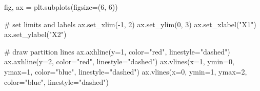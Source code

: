 \documentclass[
  letterpaper,
  DIV=11,
  numbers=noendperiod]{scrartcl}
\newenvironment{Shaded}{\begin{snugshade}}{\end{snugshade}}
\newcommand{\CommentTok}[1]{\textcolor[rgb]{0.37,0.37,0.37}{#1}}
\newcommand{\DecValTok}[1]{\textcolor[rgb]{0.68,0.00,0.00}{#1}}
\newcommand{\NormalTok}[1]{\textcolor[rgb]{0.00,0.23,0.31}{#1}}
\newcommand{\OperatorTok}[1]{\textcolor[rgb]{0.37,0.37,0.37}{#1}}
\newcommand{\StringTok}[1]{\textcolor[rgb]{0.13,0.47,0.30}{#1}}
\begin{document}
\begin{Shaded}
\begin{Highlighting}[]
\NormalTok{fig, ax }\OperatorTok{=}\NormalTok{ plt.subplots(figsize}\OperatorTok{=}\NormalTok{(}\DecValTok{6}\NormalTok{, }\DecValTok{6}\NormalTok{))}

\CommentTok{\# set limits and labels}
\NormalTok{ax.set\_xlim(}\OperatorTok{{-}}\DecValTok{1}\NormalTok{, }\DecValTok{2}\NormalTok{)}
\NormalTok{ax.set\_ylim(}\DecValTok{0}\NormalTok{, }\DecValTok{3}\NormalTok{)}
\NormalTok{ax.set\_xlabel(}\StringTok{"X1"}\NormalTok{)}
\NormalTok{ax.set\_ylabel(}\StringTok{"X2"}\NormalTok{)}

\CommentTok{\# draw partition lines}
\NormalTok{ax.axhline(y}\OperatorTok{=}\DecValTok{1}\NormalTok{, color}\OperatorTok{=}\StringTok{"red"}\NormalTok{, linestyle}\OperatorTok{=}\StringTok{"dashed"}\NormalTok{)}
\NormalTok{ax.axhline(y}\OperatorTok{=}\DecValTok{2}\NormalTok{, color}\OperatorTok{=}\StringTok{"red"}\NormalTok{, linestyle}\OperatorTok{=}\StringTok{"dashed"}\NormalTok{)}
\NormalTok{ax.vlines(x}\OperatorTok{=}\DecValTok{1}\NormalTok{, ymin}\OperatorTok{=}\DecValTok{0}\NormalTok{, ymax}\OperatorTok{=}\DecValTok{1}\NormalTok{, color}\OperatorTok{=}\StringTok{"blue"}\NormalTok{, linestyle}\OperatorTok{=}\StringTok{"dashed"}\NormalTok{)}
\NormalTok{ax.vlines(x}\OperatorTok{=}\DecValTok{0}\NormalTok{, ymin}\OperatorTok{=}\DecValTok{1}\NormalTok{, ymax}\OperatorTok{=}\DecValTok{2}\NormalTok{, color}\OperatorTok{=}\StringTok{"blue"}\NormalTok{, linestyle}\OperatorTok{=}\StringTok{"dashed"}\NormalTok{)}


\end{Highlighting}
\end{Shaded}
\end{document}
